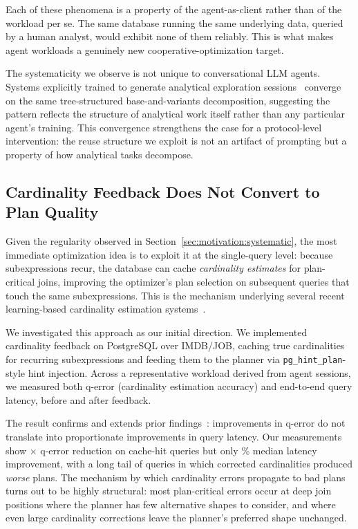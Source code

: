 Each of these phenomena is a property of the agent-as-client rather than of the workload per se. The same database running the same underlying data, queried by a human analyst, would exhibit none of them reliably. This is what makes agent workloads a genuinely new cooperative-optimization target.

The systematicity we observe is not unique to conversational LLM agents. Systems explicitly trained to generate analytical exploration sessions~\cite{linx2025,atena2020} converge on the same tree-structured base-and-variants decomposition, suggesting the pattern reflects the structure of analytical work itself rather than any particular agent's training. This convergence strengthens the case for a protocol-level intervention: the reuse structure we exploit is not an artifact of prompting but a property of how analytical tasks decompose.

\subsection{Cardinality Feedback Does Not Convert to Plan Quality}
\label{sec:motivation:cardfeedback}

Given the regularity observed in Section~\ref{sec:motivation:systematic}, the most immediate optimization idea is to exploit it at the single-query level: because subexpressions recur, the database can cache \emph{cardinality estimates} for plan-critical joins, improving the optimizer's plan selection on subsequent queries that touch the same subexpressions. This is the mechanism underlying several recent learning-based cardinality estimation systems~\cite{han2022cardeval,negi2021flowloss,lee2023dutt}.

We investigated this approach as our initial direction. We implemented cardinality feedback on PostgreSQL over IMDB/JOB, caching true cardinalities for recurring subexpressions and feeding them to the planner via \texttt{pg\_hint\_plan}-style hint injection. Across a representative workload derived from agent sessions, we measured both q-error (cardinality estimation accuracy) and end-to-end query latency, before and after feedback.

The result confirms and extends prior findings~\cite{han2022cardeval,negi2021flowloss}: improvements in q-error do not translate into proportionate improvements in query latency. Our measurements show $\times$ q-error reduction on cache-hit queries but only \% median latency improvement, with a long tail of queries in which corrected cardinalities produced \emph{worse} plans.  The mechanism by which cardinality errors propagate to bad plans turns out to be highly structural: most plan-critical errors occur at deep join positions where the planner has few alternative shapes to consider, and where even large cardinality corrections leave the planner's preferred shape unchanged.

